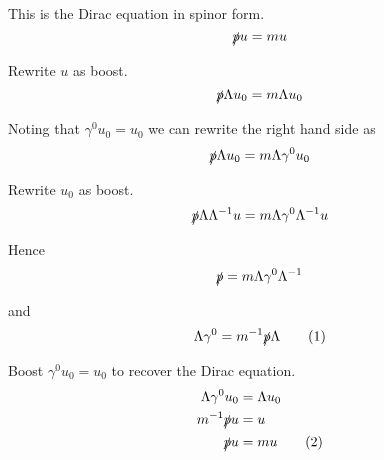 This is the Dirac equation in spinor form.
\begin{equation*}
\slashed pu=mu
\end{equation*}

Rewrite $u$ as boost.
\begin{equation*}
\slashed p\Lambda u_0=m\Lambda u_0
\end{equation*}

Noting that $\gamma^0u_0=u_0$ we can rewrite the right hand side as
\begin{equation*}
\slashed p\Lambda u_0=m\Lambda\gamma^0u_0
\end{equation*}

Rewrite $u_0$ as boost.
\begin{equation*}
\slashed p\Lambda\Lambda^{-1}u=m\Lambda\gamma^0\Lambda^{-1}u
\end{equation*}

Hence
\begin{equation*}
\slashed p=m\Lambda\gamma^0\Lambda^{-1}
\end{equation*}

and
\begin{equation*}
\Lambda\gamma^0=m^{-1}\slashed p\Lambda
\tag{1}
\end{equation*}

Boost $\gamma^0u_0=u_0$ to recover the Dirac equation.
\begin{align*}
\Lambda\gamma^0u_0&=\Lambda u_0
\\
m^{-1}\slashed pu&=u
\\
\slashed pu&=mu
\tag{2}
\end{align*}


